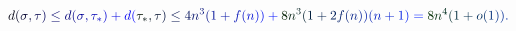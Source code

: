 \documentclass[12pt]{article}
\begin{document}
\makeatletter
\renewcommand*{\@textcolor}[3]{%
  \protect\leavevmode
  \begingroup
    \color#1{#2}#3%
  \endgroup
}
\makeatother
\begin{displaymath}
\mathcolor[RGB]{0,0,15}{d} \mathcolor[RGB]{0,0,30}{(} \mathcolor[RGB]{0,0,45}{\sigma} \mathcolor[RGB]{0,0,60}{,} \mathcolor[RGB]{0,0,75}{\tau} \mathcolor[RGB]{0,0,90}{)} \mathcolor[RGB]{0,0,105}{\leq} \mathcolor[RGB]{0,0,120}{d} \mathcolor[RGB]{0,0,135}{(} \mathcolor[RGB]{0,0,150}{\sigma} \mathcolor[RGB]{0,0,165}{,} \mathcolor[RGB]{0,0,180}{\tau} _ { \mathcolor[RGB]{0,0,195}{*} } \mathcolor[RGB]{0,0,210}{)} \mathcolor[RGB]{0,0,225}{+} \mathcolor[RGB]{0,0,240}{d} \mathcolor[RGB]{0,0,255}{(} \mathcolor[RGB]{0,15,0}{\tau} _ { \mathcolor[RGB]{0,15,15}{*} } \mathcolor[RGB]{0,15,30}{,} \mathcolor[RGB]{0,15,45}{\tau} \mathcolor[RGB]{0,15,60}{)} \mathcolor[RGB]{0,15,75}{\leq} \mathcolor[RGB]{0,15,90}{4} \mathcolor[RGB]{0,15,105}{n} ^ { \mathcolor[RGB]{0,15,120}{3} } \mathcolor[RGB]{0,15,135}{(} \mathcolor[RGB]{0,15,150}{1} \mathcolor[RGB]{0,15,165}{+} \mathcolor[RGB]{0,15,180}{f} \mathcolor[RGB]{0,15,195}{(} \mathcolor[RGB]{0,15,210}{n} \mathcolor[RGB]{0,15,225}{)} \mathcolor[RGB]{0,15,240}{)} \mathcolor[RGB]{0,15,255}{+} \mathcolor[RGB]{0,30,0}{8} \mathcolor[RGB]{0,30,15}{n} ^ { \mathcolor[RGB]{0,30,30}{3} } \mathcolor[RGB]{0,30,45}{(} \mathcolor[RGB]{0,30,60}{1} \mathcolor[RGB]{0,30,75}{+} \mathcolor[RGB]{0,30,90}{2} \mathcolor[RGB]{0,30,105}{f} \mathcolor[RGB]{0,30,120}{(} \mathcolor[RGB]{0,30,135}{n} \mathcolor[RGB]{0,30,150}{)} \mathcolor[RGB]{0,30,165}{)} \mathcolor[RGB]{0,30,180}{(} \mathcolor[RGB]{0,30,195}{n} \mathcolor[RGB]{0,30,210}{+} \mathcolor[RGB]{0,30,225}{1} \mathcolor[RGB]{0,30,240}{)} \mathcolor[RGB]{0,30,255}{=} \mathcolor[RGB]{0,45,0}{8} \mathcolor[RGB]{0,45,15}{n} ^ { \mathcolor[RGB]{0,45,30}{4} } \mathcolor[RGB]{0,45,45}{(} \mathcolor[RGB]{0,45,60}{1} \mathcolor[RGB]{0,45,75}{+} \mathcolor[RGB]{0,45,90}{o} \mathcolor[RGB]{0,45,105}{(} \mathcolor[RGB]{0,45,120}{1} \mathcolor[RGB]{0,45,135}{)} \mathcolor[RGB]{0,45,150}{)} \mathcolor[RGB]{0,45,165}{.}
\end{displaymath}
\end{document}
